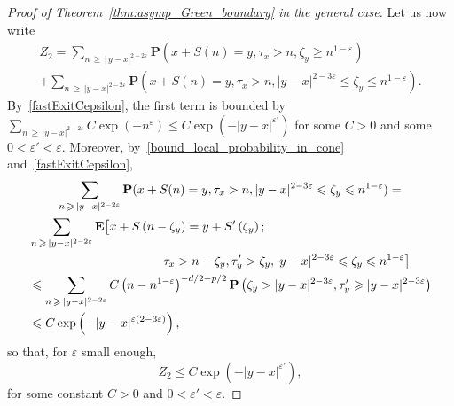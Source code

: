 \documentclass[10pt]{amsart}
\theoremstyle{definition}\newtheorem{defi}[theo]{Definition}\newtheorem{rema}[theo]{Remark}\newtheorem{exam}[theo]{Example}\newtheorem{exem}[theo]{Example}\newtheorem{nota}[theo]{Notation}
\newcommand{\pr}{\mathbf{P}}
\newcommand{\e}{\mathbf{E}}
\renewcommand{\epsilon}{\varepsilon}
\renewcommand{\leq}{\leqslant}
\renewcommand{\geq}{\geqslant}
\begin{document}
\begin{proof}[Proof of Theorem~\ref{thm:asymp_Green_boundary} in the general case]
Let us now write
\begin{multline*}
Z_{2}=\sum_{n\,\geq\,|\,y-x|^{2-2\epsilon}}\pr\left(x+S(n)=y,\tau_{x}>n,\zeta_{y}\geq n^{1-\epsilon}\right)\\
+\sum_{n\,\geq\,|y-x|^{2-2\epsilon}}\pr\left(x+S(n)=y,\tau_{x}>n,|y-x|^{2-3\epsilon}\leq \zeta_{y}\leq n^{1-\epsilon}\right).
\end{multline*}
By~\eqref{fastExitCepsilon}, the first term is bounded by $\sum_{n\,\geq\,|y-x|^{2-2\epsilon}}C\exp(-n^{\epsilon})\leq C\exp(-| y-x|^{\epsilon'})$ for some $C>0$ and some $0<\epsilon'<\epsilon$. Moreover, by~\eqref{bound_local_probability_in_cone} and~\eqref{fastExitCepsilon},
\begin{multline*}
\sum_{n\,\geq\,|y-x|^{2-2\epsilon}}\pr(x+S(n)=y,\tau_{x}>n,|y-x|^{2-3\epsilon}\leq \zeta_{y}\leq n^{1-\epsilon}) =\\
\begin{aligned}
&\sum_{n\,\geq\,|y-x|^{2-2\epsilon}}\e\big[x+S\left(n-\zeta_{y}\right)
=y+S'\left(\zeta_{y}\right);\\
&\left.\mkern190mu \tau_{x}>n-\zeta_{y},\tau'_{y}>\zeta_{y},| y-x|^{2-3\epsilon}\leq \zeta_{y}\leq n^{1-\epsilon}\right]\\
&\leq\sum_{n\,\geq\,| y-x|^{2-2\epsilon}}C\left(n-n^{1-\epsilon}\right)^{-d/2-p/2}\pr\left(\zeta_{y}>| y-x|^{2-3\epsilon},\tau'_{y} \geq | y-x|^{2-3\epsilon}\right)\\
&\leq C\exp\left(-| y-x|^{\epsilon(2-3\epsilon)}\right),
\end{aligned}
\end{multline*}
so that, for $\epsilon$ small enough,
\[
Z_{2}\leq C\exp\left(-| y-x|^{\epsilon'}\right),
\]
for some constant $C>0$ and $0<\epsilon'<\epsilon$.




\end{proof}
\end{document}
